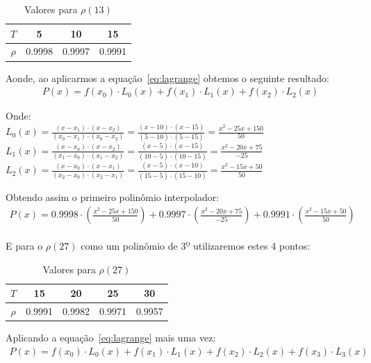 \documentclass[12pt, hidelinks]{article}
\begin{document}
\begin{table}[h]
  \centering
  \begin{tabular}{|c|c|c|c|}
    \hline
      $T$ & 5 & 10 & 15\\
    \hline
      $\rho$ & 0.9998 & 0.9997 & 0.9991\\
    \hline
  \end{tabular}
  \caption{Valores para $\rho(13)$}
\end{table}

Aonde, ao aplicarmos a equação~\eqref{eq:lagrange} obtemos o seguinte resultado:
\begin{eqnarray}\label{eq:pn}
  P(x) = f(x_0)\cdot L_0(x) + f(x_1)\cdot L_1(x) + f(x_2)\cdot L_2(x)
\end{eqnarray}

Onde: \\
$L_0(x) = \frac{(x - x_1)\cdot(x - x_2)}{(x_0 - x_1)\cdot(x_0 - x_2)} = \frac{(x - 10)\cdot(x - 15)}{(5 - 10)\cdot(5 - 15)} = \frac{x^2 - 25x + 150}{50}$\\
$L_1(x) = \frac{(x - x_0)\cdot(x - x_2)}{(x_1 - x_0)\cdot(x_1 - x_2)} = \frac{(x - 5)\cdot(x - 15)}{(10 - 5)\cdot(10 - 15)} = \frac{x^2 - 20x + 75}{-25}$\\
$L_2(x) = \frac{(x - x_0)\cdot(x - x_1)}{(x_2 - x_0)\cdot(x_2 - x_1)} = \frac{(x - 5)\cdot(x - 10)}{(15 - 5)\cdot(15 - 10)} = \frac{x^2 - 15x + 50}{50}$

Obtendo assim o primeiro polinômio interpolador:
\begin{eqnarray}\label{eq:pi1}
  P(x) = 0.9998 \cdot \left(\frac{x^2 - 25x + 150}{50}\right) + 0.9997 \cdot \left(\frac{x^2 - 20x + 75}{-25}\right) + 0.9991 \cdot \left(\frac{x^2 - 15x + 50}{50}\right)
\end{eqnarray}

E para o $\rho(27)$ como um polinômio de 3\textsuperscript{\b{o}} utilizaremos estes 4 pontos:

\begin{table}[h]
  \centering
  \begin{tabular}{|c|c|c|c|c|}
    \hline
      $T$ & 15 & 20 & 25 & 30\\
    \hline
      $\rho$ & 0.9991 & 0.9982 & 0.9971 & 0.9957\\
    \hline
  \end{tabular}
  \caption{Valores para $\rho(27)$}
\end{table}

Aplicando a equação~\eqref{eq:lagrange} mais uma vez:
\begin{eqnarray}\label{eq:pn}
  P(x) = f(x_0)\cdot L_0(x) + f(x_1)\cdot L_1(x) + f(x_2)\cdot L_2(x) + f(x_3)\cdot L_3(x)
\end{eqnarray}
\end{document}
